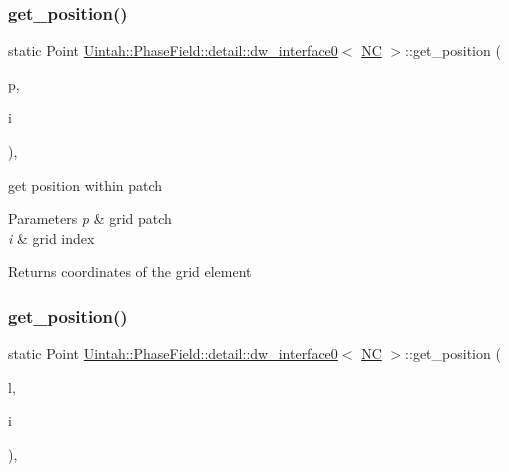 \subsubsection{\texorpdfstring{get\+\_\+position()}{get\_position()}\hspace{0.1cm}{\footnotesize\ttfamily [1/2]}}
{\footnotesize\ttfamily static Point \hyperlink{classUintah_1_1PhaseField_1_1detail_1_1dw__interface0}{Uintah\+::\+Phase\+Field\+::detail\+::dw\+\_\+interface0}$<$ \hyperlink{namespaceUintah_1_1PhaseField_a33d355affda78a83f45755ba8388cedda77924170fe82bfd58b74ca3e44139718}{NC} $>$\+::get\+\_\+position (\begin{DoxyParamCaption}\item[{const Patch $\ast$}]{p,  }\item[{const Int\+Vector \&}]{i }\end{DoxyParamCaption})\hspace{0.3cm}{\ttfamily [inline]}, {\ttfamily [static]}}



get position within patch 


\begin{DoxyParams}{Parameters}
{\em p} & grid patch \\
\hline
{\em i} & grid index \\
\hline
\end{DoxyParams}
\begin{DoxyReturn}{Returns}
coordinates of the grid element 
\end{DoxyReturn}
\mbox{\label{classUintah_1_1PhaseField_1_1detail_1_1dw__interface0_3_01NC_01_4_a85da081958a57a02d6a14b2534375a63}} 
\subsubsection{\texorpdfstring{get\+\_\+position()}{get\_position()}\hspace{0.1cm}{\footnotesize\ttfamily [2/2]}}
{\footnotesize\ttfamily static Point \hyperlink{classUintah_1_1PhaseField_1_1detail_1_1dw__interface0}{Uintah\+::\+Phase\+Field\+::detail\+::dw\+\_\+interface0}$<$ \hyperlink{namespaceUintah_1_1PhaseField_a33d355affda78a83f45755ba8388cedda77924170fe82bfd58b74ca3e44139718}{NC} $>$\+::get\+\_\+position (\begin{DoxyParamCaption}\item[{const Level $\ast$}]{l,  }\item[{const Int\+Vector \&}]{i }\end{DoxyParamCaption})\hspace{0.3cm}{\ttfamily [inline]}, {\ttfamily [static]}}



